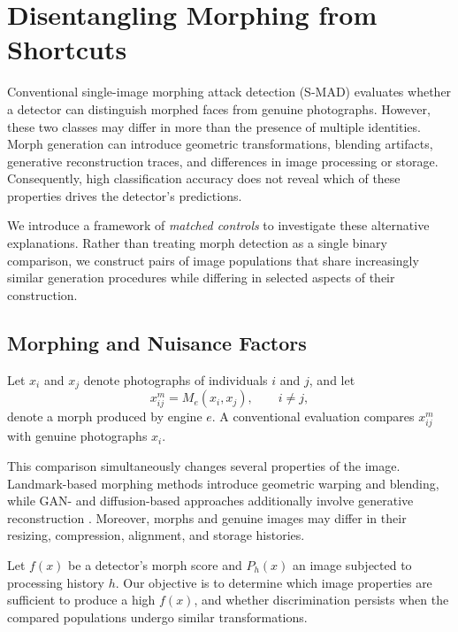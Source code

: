 
\section{Disentangling Morphing from Shortcuts}
\label{sec:controlled_eval}

Conventional single-image morphing attack detection (S-MAD)
evaluates whether a detector can distinguish morphed faces
from genuine photographs. However, these two classes may
differ in more than the presence of multiple identities.
Morph generation can introduce geometric transformations,
blending artifacts, generative reconstruction traces, and
differences in image processing or storage. Consequently,
high classification accuracy does not reveal which of these
properties drives the detector's predictions.

We introduce a framework of \emph{matched controls} to
investigate these alternative explanations. Rather than
treating morph detection as a single binary comparison,
we construct pairs of image populations that share
increasingly similar generation procedures while differing
in selected aspects of their construction.

\subsection{Morphing and Nuisance Factors}
\label{sec:morph_factors}

Let $x_i$ and $x_j$ denote photographs of individuals
$i$ and $j$, and let
\begin{equation}
    x_{ij}^{m} = M_e(x_i,x_j), \qquad i \neq j,
\end{equation}
denote a morph produced by engine $e$.
A conventional evaluation compares $x_{ij}^{m}$ with
genuine photographs $x_i$.

This comparison simultaneously changes several properties
of the image. Landmark-based morphing methods introduce
geometric warping and blending, while GAN- and diffusion-based
approaches additionally involve generative reconstruction
\cite{zhang2021mipgan,damer2023mordiff}.
Moreover, morphs and genuine images may differ in their
resizing, compression, alignment, and storage histories.

Let $f(x)$ be a detector's morph score and $P_h(x)$
an image subjected to processing history $h$.
Our objective is to determine which image properties
are sufficient to produce a high $f(x)$, and whether
discrimination persists when the compared populations
undergo similar transformations.

